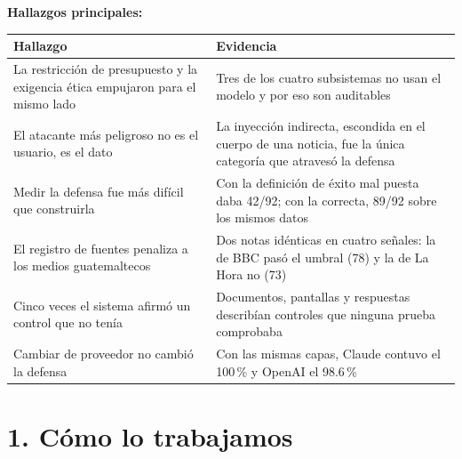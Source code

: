 \documentclass[12pt,a4paper]{article}
\begin{document}
\textbf{Hallazgos principales:}

\begin{center}
\renewcommand{\arraystretch}{1.4}
\begin{tabular}{|>{\raggedright\arraybackslash}p{7.2cm}|>{\raggedright\arraybackslash}p{6.4cm}|}
\hline
\textbf{Hallazgo} & \textbf{Evidencia} \\
\hline
La restricción de presupuesto y la exigencia ética empujaron para el mismo lado & Tres de los
cuatro subsistemas no usan el modelo y por eso son auditables \\
\hline
El atacante más peligroso no es el usuario, es el dato & La inyección indirecta, escondida en el
cuerpo de una noticia, fue la única categoría que atravesó la defensa \\
\hline
Medir la defensa fue más difícil que construirla & Con la definición de éxito mal puesta daba
42/92; con la correcta, 89/92 sobre los mismos datos \\
\hline
El registro de fuentes penaliza a los medios guatemaltecos & Dos notas idénticas en cuatro
señales: la de BBC pasó el umbral (78) y la de La Hora no (73) \\
\hline
Cinco veces el sistema afirmó un control que no tenía & Documentos, pantallas y respuestas
describían controles que ninguna prueba comprobaba \\
\hline
Cambiar de proveedor no cambió la defensa & Con las mismas capas, Claude contuvo el 100\,\% y
OpenAI el 98.6\,\% \\
\hline
\end{tabular}
\end{center}

\section{1. Cómo lo trabajamos}
\end{document}
